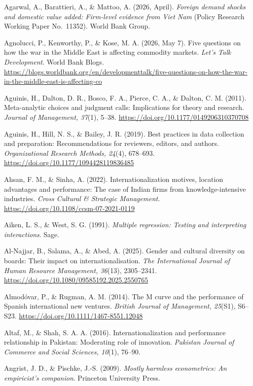 \documentclass[
  a4paper,
  13pt]{extreport}
\begin{document}
Agarwal, A., Barattieri, A., \& Mattoo, A. (2026, April). \emph{Foreign
demand shocks and domestic value added: Firm-level evidence from Viet
Nam} (Policy Research Working Paper No.~11352). World Bank Group.

Agnolucci, P., Kenworthy, P., \& Kose, M. A. (2026, May 7). Five
questions on how the war in the Middle East is affecting commodity
markets. \emph{Let's Talk Development}. World Bank Blogs.
\url{https://blogs.worldbank.org/en/developmenttalk/five-questions-on-how-the-war-in-the-middle-east-is-affecting-co}

Aguinis, H., Dalton, D. R., Bosco, F. A., Pierce, C. A., \& Dalton, C.
M. (2011). Meta-analytic choices and judgment calls: Implications for
theory and research. \emph{Journal of Management, 37}(1), 5--38.
\url{https://doi.org/10.1177/0149206310370708}

Aguinis, H., Hill, N. S., \& Bailey, J. R. (2019). Best practices in
data collection and preparation: Recommendations for reviewers, editors,
and authors. \emph{Organizational Research Methods, 24}(4), 678--693.
\url{https://doi.org/10.1177/1094428119836485}

Ahsan, F. M., \& Sinha, A. (2022). Internationalization motives,
location advantages and performance: The case of Indian firms from
knowledge-intensive industries. \emph{Cross Cultural \& Strategic
Management}. \url{https://doi.org/10.1108/ccsm-07-2021-0119}

Aiken, L. S., \& West, S. G. (1991). \emph{Multiple regression: Testing
and interpreting interactions}. Sage.

Al-Najjar, B., Salama, A., \& Abed, A. (2025). Gender and cultural
diversity on boards: Their impact on internationalisation. \emph{The
International Journal of Human Resource Management, 36}(13), 2305--2341.
\url{https://doi.org/10.1080/09585192.2025.2550765}

Almodóvar, P., \& Rugman, A. M. (2014). The M curve and the performance
of Spanish international new ventures. \emph{British Journal of
Management, 25}(S1), S6--S23.
\url{https://doi.org/10.1111/1467-8551.12048}

Altaf, M., \& Shah, S. A. A. (2016). Internationalization and
performance relationship in Pakistan: Moderating role of innovation.
\emph{Pakistan Journal of Commerce and Social Sciences, 10}(1), 76--90.

Angrist, J. D., \& Pischke, J.-S. (2009). \emph{Mostly harmless
econometrics: An empiricist's companion}. Princeton University Press.
\end{document}
